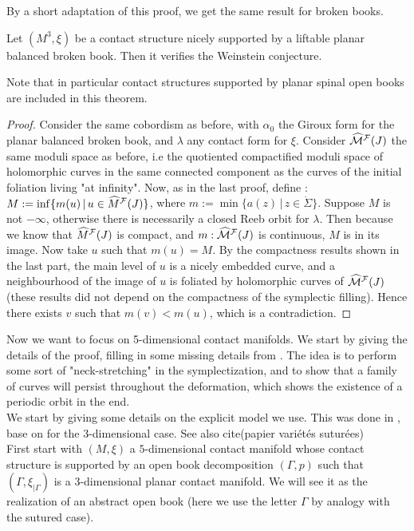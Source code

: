 \documentclass[../main.tex]{subfiles}
\begin{document}
By a short adaptation of this proof, we get the same result for broken books.\\

\begin{theorem}
Let $(M^3,\xi)$ be a contact structure nicely supported by a liftable planar balanced broken book. Then it verifies the Weinstein conjecture. 
\end{theorem}

\begin{remark}
Note that in particular contact structures supported by planar spinal open books are included in this theorem.
\end{remark}

\begin{proof}
Consider the same cobordism as before, with $\alpha_0$ the Giroux form for the planar balanced broken book, and $\lambda$ any contact form for $\xi$. Consider $\widehat{\mathcal{M}}^{\mathcal{F}}(J)$ the same moduli space as before, i.e the quotiented compactified moduli space of holomorphic curves in the same connected component as the curves of the initial foliation living "at infinity". Now, as in the last proof, define : $M := \inf\{m(u)\,|\, u\in\widehat{M}^{\mathcal{F}}(J)\}$, where $m := \min\{a(z)\,|\,z\in\dot\Sigma\}$. Suppose $M$ is not $-\infty$, otherwise there is necessarily a closed Reeb orbit for $\lambda$. Then because we know that $\widehat{M}^{\mathcal{F}}(J)$ is compact, and $m : \widehat{\mathcal{M}}^{\mathcal{F}}(J)$ is continuous, $M$ is in its image. Now take $u$ such that $m(u) = M$. By the compactness results shown in the last part, the main level of $u$ is a nicely embedded curve, and a neighbourhood of the image of $u$ is foliated by holomorphic curves of $\widehat{\mathcal{M}}^{\mathcal{F}}(J)$ (these results did not depend on the compactness of the symplectic filling). Hence there exists $v$ such that $m(v)<m(u)$, which is a contradiction. 
\end{proof}


Now we want to focus on 5-dimensional contact manifolds. We start by giving the details of the proof, filling in some missing details from \cite{acu_weinstein_2017}. The idea is to perform some sort of "neck-stretching" in the symplectization, and to show that a family of curves will persist throughout the deformation, which shows the existence of a periodic orbit in the end. \\

We start by giving some details on the explicit model we use. This was done in \cite{roux_cas_nodate}, base on \cite{wendl_open_2009} for the 3-dimensional case. See also \color{red}cite(papier variétés suturées)\color{black}\\
First start with $(M,\xi)$ a $5$-dimensional contact manifold whose contact structure is supported by an open book decomposition $(\Gamma,p)$ such that $(\Gamma,\xi_{|\Gamma})$ is a 3-dimensional planar contact manifold. We will see it as the realization of an abstract open book (here we use the letter $\Gamma$ by analogy with the sutured case).\\
\end{document}
